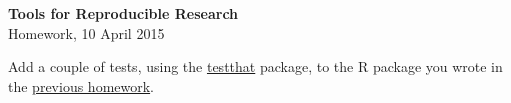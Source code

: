 \documentclass[12pt]{article}
\begin{document}
\thispagestyle{empty}

\textbf{Tools for Reproducible Research} \\
Homework, 10 April 2015

\bigskip

Add a couple of tests, using the
\href{https://github.com/hadley/testthat}{testthat} package, to the
R package you wrote in the \href{http://kbroman.org/Tools4RR/assets/homework/08_homework.pdf}{previous homework}.
\end{document}
